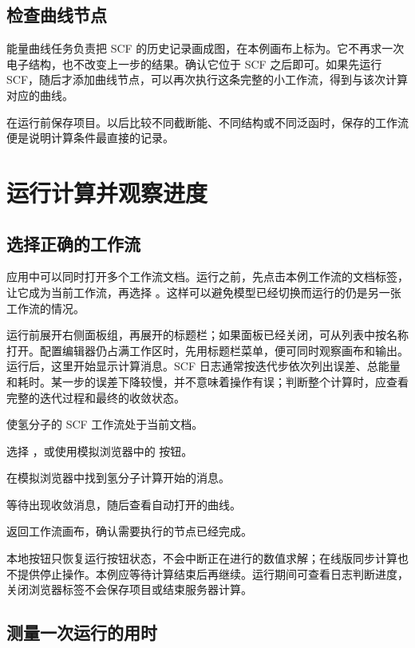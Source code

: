 \subsection{检查曲线节点}

能量曲线任务负责把 SCF 的历史记录画成图，在本例画布上标为。它不再求一次电子结构，也不改变上一步的结果。确认它位于 SCF 之后即可。如果先运行 SCF，随后才添加曲线节点，可以再次执行这条完整的小工作流，得到与该次计算对应的曲线。

在运行前保存项目。以后比较不同截断能、不同结构或不同泛函时，保存的工作流便是说明计算条件最直接的记录。

\section{运行计算并观察进度}

\subsection{选择正确的工作流}

应用中可以同时打开多个工作流文档。运行之前，先点击本例工作流的文档标签，让它成为当前工作流，再选择 。这样可以避免模型已经切换而运行的仍是另一张工作流的情况。

运行前展开右侧面板组，再展开的标题栏；如果面板已经关闭，可从列表中按名称打开。配置编辑器仍占满工作区时，先用标题栏菜单，便可同时观察画布和输出。运行后，这里开始显示计算消息。SCF 日志通常按迭代步依次列出误差、总能量和耗时。某一步的误差下降较慢，并不意味着操作有误；判断整个计算时，应查看完整的迭代过程和最终的收敛状态。

\begin{steps}
\item 使氢分子的 SCF 工作流处于当前文档。
\item 选择 ，或使用模拟浏览器中的  按钮。
\item 在模拟浏览器中找到氢分子计算开始的消息。
\item 等待出现收敛消息，随后查看自动打开的曲线。
\item 返回工作流画布，确认需要执行的节点已经完成。
\end{steps}

本地按钮只恢复运行按钮状态，不会中断正在进行的数值求解；在线版同步计算也不提供停止操作。本例应等待计算结束后再继续。运行期间可查看日志判断进度，关闭浏览器标签不会保存项目或结束服务器计算。

\subsection{测量一次运行的用时}

